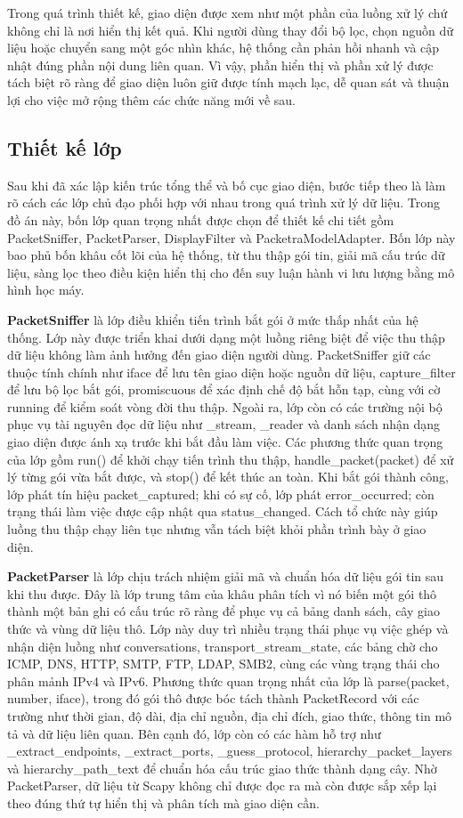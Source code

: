 \documentclass[../DoAn.tex]{subfiles}
\begin{document}
Trong quá trình thiết kế, giao diện được xem như một phần của luồng xử lý chứ không chỉ là nơi hiển thị kết quả. Khi người dùng thay đổi bộ lọc, chọn nguồn dữ liệu hoặc chuyển sang một góc nhìn khác, hệ thống cần phản hồi nhanh và cập nhật đúng phần nội dung liên quan. Vì vậy, phần hiển thị và phần xử lý được tách biệt rõ ràng để giao diện luôn giữ được tính mạch lạc, dễ quan sát và thuận lợi cho việc mở rộng thêm các chức năng mới về sau.
\subsection{Thiết kế lớp}
Sau khi đã xác lập kiến trúc tổng thể và bố cục giao diện, bước tiếp theo là làm rõ cách các lớp chủ đạo phối hợp với nhau trong quá trình xử lý dữ liệu. Trong đồ án này, bốn lớp quan trọng nhất được chọn để thiết kế chi tiết gồm PacketSniffer, PacketParser, DisplayFilter và PacketraModelAdapter. Bốn lớp này bao phủ bốn khâu cốt lõi của hệ thống, từ thu thập gói tin, giải mã cấu trúc dữ liệu, sàng lọc theo điều kiện hiển thị cho đến suy luận hành vi lưu lượng bằng mô hình học máy.

\textbf{PacketSniffer} là lớp điều khiển tiến trình bắt gói ở mức thấp nhất của hệ thống. Lớp này được triển khai dưới dạng một luồng riêng biệt để việc thu thập dữ liệu không làm ảnh hưởng đến giao diện người dùng. PacketSniffer giữ các thuộc tính chính như iface để lưu tên giao diện hoặc nguồn dữ liệu, capture\_filter để lưu bộ lọc bắt gói, promiscuous để xác định chế độ bắt hỗn tạp, cùng với cờ running để kiểm soát vòng đời thu thập. Ngoài ra, lớp còn có các trường nội bộ phục vụ tài nguyên đọc dữ liệu như \_stream, \_reader và danh sách nhận dạng giao diện được ánh xạ trước khi bắt đầu làm việc. Các phương thức quan trọng của lớp gồm run() để khởi chạy tiến trình thu thập, handle\_packet(packet) để xử lý từng gói vừa bắt được, và stop() để kết thúc an toàn. Khi bắt gói thành công, lớp phát tín hiệu packet\_captured; khi có sự cố, lớp phát error\_occurred; còn trạng thái làm việc được cập nhật qua status\_changed. Cách tổ chức này giúp luồng thu thập chạy liên tục nhưng vẫn tách biệt khỏi phần trình bày ở giao diện.

\textbf{PacketParser} là lớp chịu trách nhiệm giải mã và chuẩn hóa dữ liệu gói tin sau khi thu được. Đây là lớp trung tâm của khâu phân tích vì nó biến một gói thô thành một bản ghi có cấu trúc rõ ràng để phục vụ cả bảng danh sách, cây giao thức và vùng dữ liệu thô. Lớp này duy trì nhiều trạng thái phục vụ việc ghép và nhận diện luồng như conversations, transport\_stream\_state, các bảng chờ cho ICMP, DNS, HTTP, SMTP, FTP, LDAP, SMB2, cùng các vùng trạng thái cho phân mảnh IPv4 và IPv6. Phương thức quan trọng nhất của lớp là parse(packet, number, iface), trong đó gói thô được bóc tách thành PacketRecord với các trường như thời gian, độ dài, địa chỉ nguồn, địa chỉ đích, giao thức, thông tin mô tả và dữ liệu liên quan. Bên cạnh đó, lớp còn có các hàm hỗ trợ như \_extract\_endpoints, \_extract\_ports, \_guess\_protocol, hierarchy\_packet\_layers và hierarchy\_path\_text để chuẩn hóa cấu trúc giao thức thành dạng cây. Nhờ PacketParser, dữ liệu từ Scapy không chỉ được đọc ra mà còn được sắp xếp lại theo đúng thứ tự hiển thị và phân tích mà giao diện cần.
\end{document}
